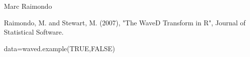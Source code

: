 \begin{Author}\relax
Marc Raimondo
\end{Author}
\begin{References}\relax
Raimondo, M. and Stewart, M. (2007),
"The WaveD Transform in R", Journal of Statistical Software.
\end{References}
\begin{SeeAlso}\relax
{}
\end{SeeAlso}
\begin{Examples}
\begin{ExampleCode} 
data=waved.example(TRUE,FALSE)
\end{ExampleCode}
\end{Examples}

